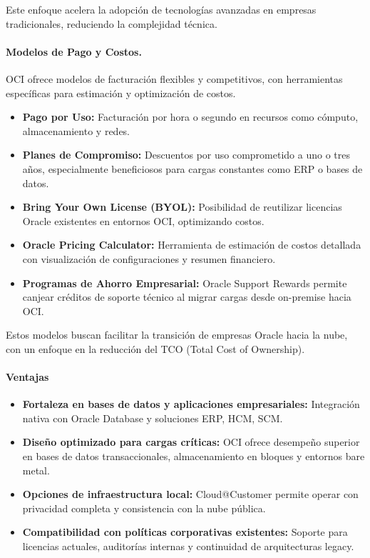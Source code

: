 {                Este enfoque acelera la adopción de tecnologías avanzadas en empresas tradicionales, reduciendo la complejidad técnica.
                
                \paragraph{Modelos de Pago y Costos.}
                OCI ofrece modelos de facturación flexibles y competitivos, con herramientas específicas para estimación y optimización de costos.
                
                \begin{itemize}
                    \item \textbf{Pago por Uso:} Facturación por hora o segundo en recursos como cómputo, almacenamiento y redes.
                    \item \textbf{Planes de Compromiso:} Descuentos por uso comprometido a uno o tres años, especialmente beneficiosos para cargas constantes como ERP o bases de datos.
                    \item \textbf{Bring Your Own License (BYOL):} Posibilidad de reutilizar licencias Oracle existentes en entornos OCI, optimizando costos.
                    \item \textbf{Oracle Pricing Calculator:} Herramienta de estimación de costos detallada con visualización de configuraciones y resumen financiero.
                    \item \textbf{Programas de Ahorro Empresarial:} Oracle Support Rewards permite canjear créditos de soporte técnico al migrar cargas desde on-premise hacia OCI.
                \end{itemize}
                
                Estos modelos buscan facilitar la transición de empresas Oracle hacia la nube, con un enfoque en la reducción del TCO (Total Cost of Ownership).
                
                \paragraph{Ventajas}
                
                \begin{itemize}
                    \item \textbf{Fortaleza en bases de datos y aplicaciones empresariales:} Integración nativa con Oracle Database y soluciones ERP, HCM, SCM.
                    \item \textbf{Diseño optimizado para cargas críticas:} OCI ofrece desempeño superior en bases de datos transaccionales, almacenamiento en bloques y entornos bare metal.
                    \item \textbf{Opciones de infraestructura local:} Cloud@Customer permite operar con privacidad completa y consistencia con la nube pública.
                    \item \textbf{Compatibilidad con políticas corporativas existentes:} Soporte para licencias actuales, auditorías internas y continuidad de arquitecturas legacy.
                \end{itemize}
                
}
